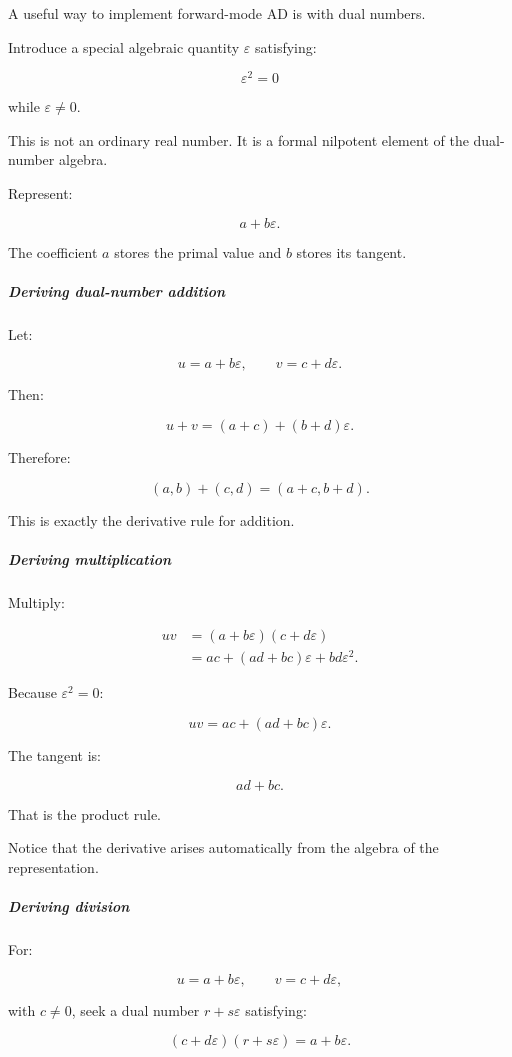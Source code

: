 A useful way to implement forward-mode AD is with dual numbers.

Introduce a special algebraic quantity \(\varepsilon\) satisfying:

\[
\boxed{\varepsilon^2=0}
\]

while \(\varepsilon\ne0\).

This is not an ordinary real number. It is a formal nilpotent element of the dual-number algebra.

Represent:

\[
a+b\varepsilon.
\]

The coefficient \(a\) stores the primal value and \(b\) stores its tangent.

\subparagraph{Deriving dual-number addition}\label{deriving-dual-number-addition}

Let:

\[
u=a+b\varepsilon, \qquad v=c+d\varepsilon.
\]

Then:

\[
u+v=(a+c)+(b+d)\varepsilon.
\]

Therefore:

\[
\boxed{ (a,b)+(c,d)=(a+c,b+d) }.
\]

This is exactly the derivative rule for addition.

\subparagraph{Deriving multiplication}\label{deriving-multiplication}

Multiply:

\[
\begin{aligned} uv &=(a+b\varepsilon)(c+d\varepsilon)\\ &=ac+(ad+bc)\varepsilon+bd\varepsilon^2. \end{aligned}
\]

Because \(\varepsilon^2=0\):

\[
\boxed{ uv=ac+(ad+bc)\varepsilon }.
\]

The tangent is:

\[
ad+bc.
\]

That is the product rule.

Notice that the derivative arises automatically from the algebra of the representation.

\subparagraph{Deriving division}\label{deriving-division}

For:

\[
u=a+b\varepsilon,\qquad v=c+d\varepsilon,
\]

with \(c\ne0\), seek a dual number \(r+s\varepsilon\) satisfying:

\[
(c+d\varepsilon)(r+s\varepsilon) = a+b\varepsilon.
\]

